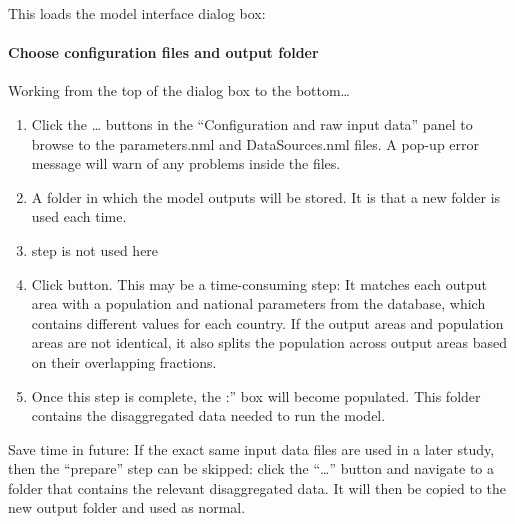 \documentclass[letterpaper,10pt,english]{sphinxmanual}
\begin{document}
This loads the model interface dialog box:

\begin{figure}[htbp]
\centering
\capstart

\noindent{}
\caption{}\label{\detokenize{Tutorials/LQF:id1}}\end{figure}


\paragraph{Choose configuration files and output folder}
\label{\detokenize{Tutorials/LQF:choose-configuration-files-and-output-folder}}
Working from the top of the dialog box to the bottom…
\begin{enumerate}
\item {} 
Click the … buttons in the “Configuration and raw input data” panel
to browse to the parameters.nml and DataSources.nml files. A pop-up
error message will warn of any problems inside the files.

\item {} 
 A folder in which the model outputs will be stored.
It is  that a new folder is used each time.

\item {} 
 step is not used here

\item {} 
Click  button. This may be a
time-consuming step: It matches each output area with a population
and national parameters from the database, which contains different
values for each country. If the output areas and population areas are
not identical, it also splits the population across output areas
based on their overlapping fractions.

\item {} 
Once this step is complete, the :” box will become
populated. This folder contains the disaggregated data needed to run
the model.

\end{enumerate}

 Save time in future: If the exact same input data files are
used in a later study, then the “prepare” step can be skipped: click the
“…” button and navigate to a folder that contains the relevant
disaggregated data. It will then be copied to the new output folder and
used as normal.
\end{document}
